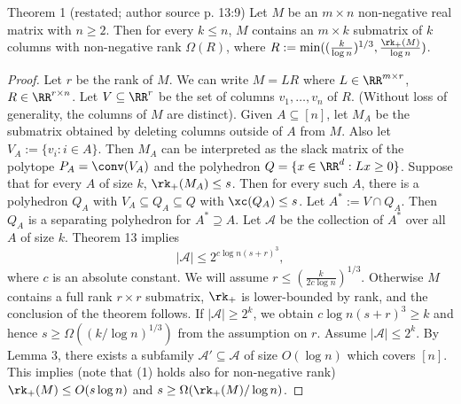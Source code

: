 \begin{originalresult}{Theorem 1 (restated; author source p. 13:9)}
Let $M$ be an $m\times n$ non-negative real matrix with $n\ge2$. Then for every $k\le n$, $M$ contains an $m\times k$ submatrix of $k$ columns with non-negative rank $\Omega(R)$, where $R:=\min((\frac k{\log n})^{1/3},\frac{\rk_+(M)}{\log n})$.
\end{originalresult}
\begin{proof}
Let $r$ be the rank of $M$. We can write $M=LR$ where $L\in\RR^{m\times r}$, $R\in\RR^{r\times n}$. Let $V\subseteq\RR^r$ be the set of columns $v_1,\ldots,v_n$ of $R$. (Without loss of generality, the columns of $M$ are distinct). Given $A\subseteq[n]$, let $M_A$ be the submatrix obtained by deleting columns outside of $A$ from $M$. Also let $V_A:=\{v_i:i\in A\}$. Then $M_A$ can be interpreted as the slack matrix of the polytope $P_A=\conv(V_A)$ and the polyhedron $Q=\{x\in\RR^d:Lx\ge0\}$.
Suppose that for every $A$ of size $k$, $\rk_+(M_A)\le s$. Then for every such $A$, there is a polyhedron $Q_A$ with $V_A\subseteq Q_A\subseteq Q$ with $\xc(Q_A)\le s$. Let $A^*:=V\cap Q_A$. Then $Q_A$ is a separating polyhedron for $A^*\supseteq A$. Let $\mathcal A$ be the collection of $A^*$ over all $A$ of size $k$. Theorem 13 implies
\[|\mathcal A|\le2^{c\log n(s+r)^3},\]
where $c$ is an absolute constant.
We will assume $r\le(\frac k{2c\log n})^{1/3}$. Otherwise $M$ contains a full rank $r\times r$ submatrix, $\rk_+$ is lower-bounded by rank, and the conclusion of the theorem follows.
If $|\mathcal A|\ge2^k$, we obtain $c\log n(s+r)^3\ge k$ and hence $s\ge\Omega((k/\log n)^{1/3})$ from the assumption on $r$.
Assume $|\mathcal A|\le2^k$. By Lemma 3, there exists a subfamily $\mathcal A'\subseteq\mathcal A$ of size $O(\log n)$ which covers $[n]$. This implies (note that (1) holds also for non-negative rank) $\rk_+(M)\le O(s\log n)$ and $s\ge\Omega(\rk_+(M)/\log n)$.
\end{proof}
